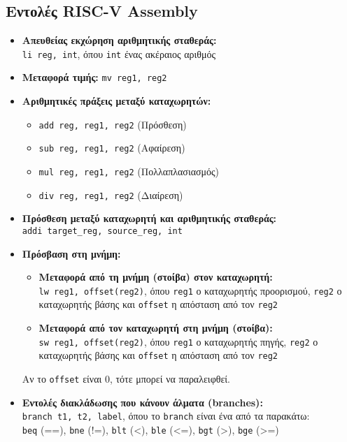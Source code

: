 \documentclass[12pt,a4paper]{article}
\begin{document}
\subsection{Εντολές RISC-V Assembly}
\begin{itemize}
    \item \textbf{Απευθείας εκχώρηση αριθμητικής σταθεράς:} \\
    \texttt{li reg, int}, όπου \texttt{int} ένας ακέραιος αριθμός

    \item \textbf{Μεταφορά τιμής:} \texttt{mv reg1, reg2}

    \item \textbf{Αριθμητικές πράξεις μεταξύ καταχωρητών:}
    \begin{itemize}
        \item \texttt{add reg, reg1, reg2} (Πρόσθεση)
        \item \texttt{sub reg, reg1, reg2} (Αφαίρεση)
        \item \texttt{mul reg, reg1, reg2} (Πολλαπλασιασμός)
        \item \texttt{div reg, reg1, reg2} (Διαίρεση)
    \end{itemize}

    \item \textbf{Πρόσθεση μεταξύ καταχωρητή και αριθμητικής σταθεράς:} \\
    \texttt{addi target\_reg, source\_reg, int}

    \item \textbf{Πρόσβαση στη μνήμη:}
    \begin{itemize}
        \item \textbf{Μεταφορά από τη μνήμη (στοίβα) στον καταχωρητή:} \\
        \texttt{lw reg1, offset(reg2)}, όπου \texttt{reg1} ο καταχωρητής προορισμού, \texttt{reg2} ο καταχωρητής βάσης και \texttt{offset} η απόσταση από τον \texttt{reg2}

        \item \textbf{Μεταφορά από τον καταχωρητή στη μνήμη (στοίβα):} \\
        \texttt{sw reg1, offset(reg2)}, όπου \texttt{reg1} ο καταχωρητής πηγής, \texttt{reg2} ο καταχωρητής βάσης και \texttt{offset} η απόσταση από τον \texttt{reg2}
    \end{itemize}
    Αν το \texttt{offset} είναι 0, τότε μπορεί να παραλειφθεί.

    \item \textbf{Εντολές διακλάδωσης που κάνουν άλματα (branches):} \\
    \texttt{branch t1, t2, label}, όπου το \texttt{branch} είναι ένα από τα παρακάτω: \\
    \texttt{beq} (==), \texttt{bne} (!=), \texttt{blt} (<), \texttt{ble} (<=), \texttt{bgt} (>), \texttt{bge} (>=)


\end{itemize}
\end{document}
